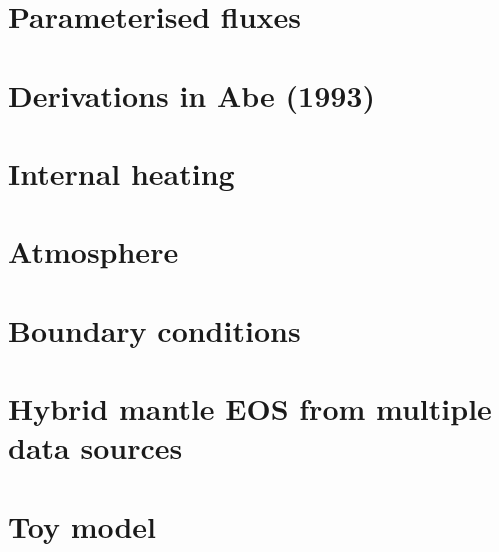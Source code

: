 \documentclass[12pt,notitlepage]{article}
\begin{document}
\section{Parameterised fluxes}


\section{Derivations in Abe (1993)}


\section{Internal heating}


\section{Atmosphere}


\section{Boundary conditions}


\section{Hybrid mantle EOS from multiple data sources}


\section{Toy model}


\appendix





%
%
\end{document}

